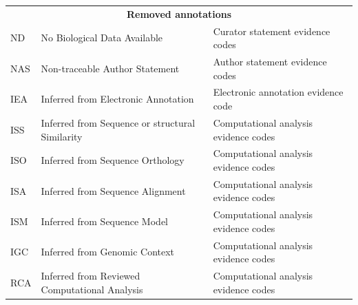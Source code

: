 \documentclass[ijms,article,submit,moreauthors,pdftex]{Definitions/mdpi}
\begin{document}
\begin{table}[]
{\begin{tabular}{lll}
\multicolumn{3}{c}{\textbf{Removed annotations}}                                                                                                                                                \\
\rowcolor[HTML]{C0C0C0} 
ND                                                               & No Biological Data Available                                  & Curator statement evidence codes                             \\
NAS                                                              & Non-traceable Author Statement                                & Author statement evidence codes                              \\
\rowcolor[HTML]{C0C0C0} 
IEA                                                              & Inferred from Electronic Annotation                           & Electronic annotation evidence code                          \\
ISS                                                              & Inferred from Sequence or structural Similarity               & Computational analysis evidence codes                        \\
\rowcolor[HTML]{C0C0C0} 
ISO                                                              & Inferred from Sequence Orthology                              & Computational analysis evidence codes                        \\
ISA                                                              & Inferred from Sequence Alignment                              & Computational analysis evidence codes                        \\
\rowcolor[HTML]{C0C0C0} 
ISM                                                              & Inferred from Sequence Model                                  & Computational analysis evidence codes                        \\
IGC                                                              & Inferred from Genomic Context                                 & Computational analysis evidence codes                        \\
\rowcolor[HTML]{C0C0C0} 
RCA                                                              & Inferred from Reviewed Computational Analysis & Computational analysis evidence codes
\end{tabular}%
}
\end{table}


\end{document}
